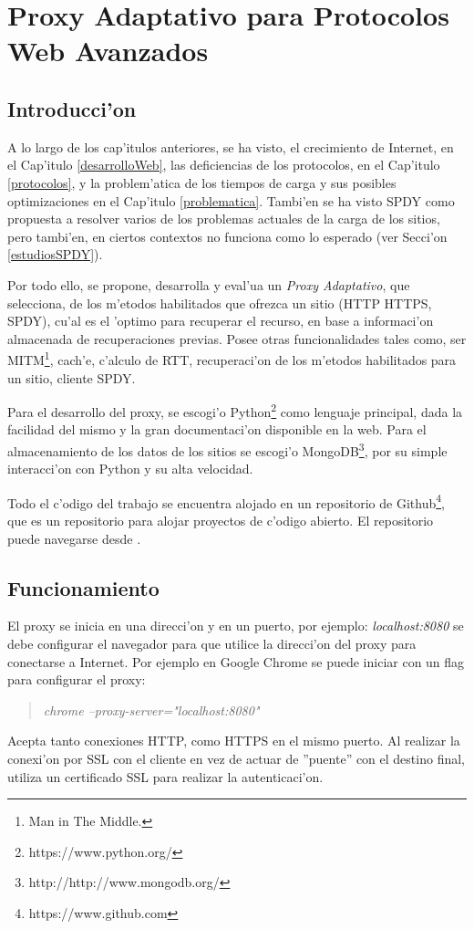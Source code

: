 \chapter{Proxy Adaptativo para Protocolos Web Avanzados}
\label{spdyproxypython}

\section{Introducci'on}

A lo largo de los cap'itulos anteriores, se ha visto, el crecimiento de Internet, en el Cap'itulo \ref{desarrolloWeb}, las deficiencias de los protocolos, en el Cap'itulo \ref{protocolos}, y la problem'atica de los tiempos de carga y sus posibles optimizaciones en el Cap'itulo \ref{problematica}. Tambi'en se ha visto SPDY como propuesta a resolver varios de los problemas actuales de la carga de los sitios, pero tambi'en, en ciertos contextos no funciona como lo esperado (ver Secci'on \ref{estudiosSPDY}).

Por todo ello, se propone, desarrolla y eval'ua un \textit{Proxy Adaptativo}, que selecciona, de los m'etodos habilitados que ofrezca un sitio (HTTP HTTPS, SPDY), cu'al es el 'optimo para recuperar el recurso, en base a informaci'on almacenada de recuperaciones previas. Posee otras funcionalidades tales como, ser MITM\footnote{Man in The Middle.}, cach'e, c'alculo de RTT, recuperaci'on de los m'etodos habilitados para un sitio, cliente SPDY.

Para el desarrollo del proxy, se escogi'o Python\footnote{https://www.python.org/} como lenguaje principal, dada la facilidad del mismo y la gran documentaci'on disponible en la web. Para el almacenamiento de los datos de los sitios se escogi'o MongoDB\footnote{http://http://www.mongodb.org/}, por su simple interacci'on con Python y su alta velocidad.

Todo el c'odigo del trabajo se encuentra alojado en un repositorio de Github\footnote{https://www.github.com}, que es un repositorio para alojar proyectos de c'odigo abierto. El repositorio puede navegarse desde \citep{spdyproxypython}.

\section{Funcionamiento}

El proxy se inicia en una direcci'on y en un puerto, por ejemplo: \textit{localhost:8080} se debe configurar el navegador para que utilice la direcci'on del proxy para conectarse a Internet. Por ejemplo en Google Chrome se puede iniciar con un flag para configurar el proxy:
\begin{quote}
\textit{chrome --proxy-server="localhost:8080"}
\end{quote}
Acepta tanto conexiones HTTP, como HTTPS en el mismo puerto. Al realizar la conexi'on por SSL con el cliente en vez de actuar de ''puente'' con el destino final, utiliza un certificado SSL para realizar la autenticaci'on.

